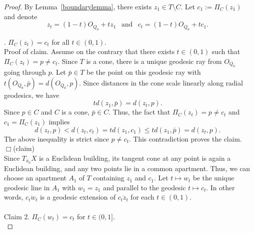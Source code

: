 \documentclass[12pt]{amsart}
\theoremstyle{definition}
\numberwithin{equation}{section}
\begin{document}
\begin{proof}
By Lemma~\ref{boundarylemma}, there exists  $z_1 \in T \setminus C$.   Let $c_1 :=\Pi_C(z_1)$ and denote
\[
z_t=(1-t)O_{Q_0} + tz_1 \ \ \mbox{ and } \ \ c_t=(1-t)O_{Q_0}+tc_1.
\]

\vspace*{0.2in}

. $\Pi_C(z_t)=c_t$ for all $t \in (0,1)$. \\

{\sc Proof of claim.} Assume on the contrary that there exists $t \in (0,1)$ such that $\Pi_C(z_t)=p \neq c_t$.  Since $T$ is a cone, there is a  unique geodesic ray   from $O_{Q_0}$ going through $p$.  Let $\bar p \in T$ be the point on this geodesic ray with $t(O_{Q_0},\bar p)=d(O_{Q_0},p)$.  Since distances in the cone scale linearly along radial geodesics, we have 
\[
td(z_1,\bar p)=d(z_t,p).
\]
Since $p \in C$ and $C$ is a cone, $\bar p \in C$.  Thus, the fact that  $\Pi_C(z_t)=p \neq c_t$ and $c_1=\Pi_C(z_1)$ implies
\[
d(z_t,p)<d(z_t,c_t)=td(z_1,c_1)\leq td(z_1,\bar p)=d(z_t,p).
\] 
The above inequality is strict since $p\neq c_t$. This contradiction  proves the claim. \hfill $\Box$(claim)\\

Since $T_{x_0}X$ is a Euclidean building, its tangent cone at any point is again a Euclidean building, and any two points lie in a common apartment.  Thus, we can choose an apartment $A_1$  of $T$  containing $z_1$ and $c_1$.  
Let $t \mapsto w_t$ be the unique geodesic line in $A_1$ with  $w_1=z_1$ and parallel to the geodesic $t \mapsto c_t$.
  In other words, $\overline{c_tw_t}$ is a geodesic extension of $\overline{c_tz_t}$ for each $t \in (0,1)$.\\
  \\
{\sc Claim 2.} $\Pi_C(w_t)=c_t$ for $t \in (0,1]$.  \\


\end{proof}
\end{document}
